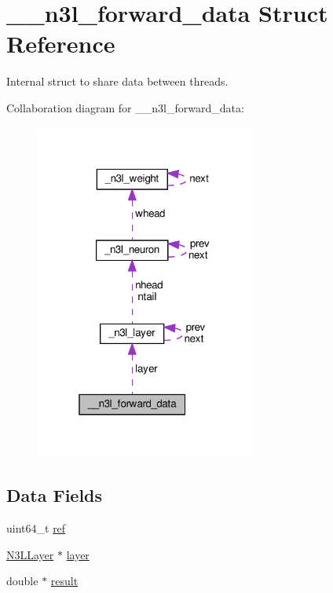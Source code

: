 \hypertarget{struct____n3l__forward__data}{}\section{\+\_\+\+\_\+n3l\+\_\+forward\+\_\+data Struct Reference}
\label{struct____n3l__forward__data}


Internal struct to share data between threads.  




Collaboration diagram for \+\_\+\+\_\+n3l\+\_\+forward\+\_\+data\+:
\nopagebreak
\begin{figure}[H]
\begin{center}
\leavevmode
\includegraphics[width=205pt]{struct____n3l__forward__data__coll__graph}
\end{center}
\end{figure}
\subsection*{Data Fields}
\begin{DoxyCompactItemize}
\item 
uint64\+\_\+t \hyperlink{struct____n3l__forward__data_ada78b9bd1418f8dccab76319afb7d64b}{ref}
\item 
\hyperlink{n3__header_8h_a9ee3a7104816bdb6222148cfe9ca8ad9}{N3\+L\+Layer} $\ast$ \hyperlink{struct____n3l__forward__data_aaeb45910cc54c7f3a770dbd124477fc2}{layer}
\item 
double $\ast$ \hyperlink{struct____n3l__forward__data_ac870eae5ce14b297b5d78cc7112c8cec}{result}
\end{DoxyCompactItemize}



